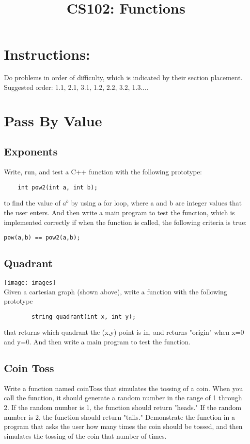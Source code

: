 \documentclass{article}
\begin{document}
\title{CS102: Functions}

\maketitle
\section*{Instructions:}
Do problems in order of difficulty, which is indicated by their section placement. Suggested order: 1.1, 2.1, 3.1, 1.2, 2.2, 3.2,  1.3....
\section{Pass By Value}

\subsection{Exponents}
Write, run, and test a C++ function with the following prototype:
\begin{verbatim}
	int pow2(int a, int b);
\end{verbatim}
to find the value of $a^{b}$  by using a for loop, where a and b are integer values that the user enters. And then write a main program to test the function, which is implemented correctly if when the function is called, the following criteria is true:
\begin{verbatim}
pow(a,b) == pow2(a,b);
\end{verbatim}

\subsection{Quadrant}
\texttt{[image: images]}\\
Given a cartesian graph (shown above), write a function with the following prototype 
\begin{verbatim}
        string quadrant(int x, int y);
\end{verbatim}
that returns which quadrant the (x,y) point is in, and returns "origin" when x=0 and y=0. And then write a main program to test the function.

\subsection{Coin Toss}
Write a function named coinToss that simulates the tossing of a coin. When you call the function, it should generate a random number in the range of 1 through 2. If the random number is 1, the function should return "heads." If the random number is 2, the function should return "tails." Demonstrate the function in a program that asks the user how many times  the coin should be tossed, and then simulates the tossing of the coin that number of times. 
\end{document}
